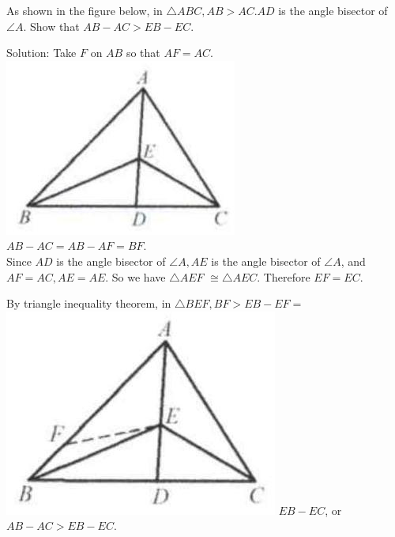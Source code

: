 \documentclass{article}
\begin{document}
As shown in the figure below, in \(\triangle A B C, A B>A C . A D\) is the angle bisector of \(\angle A\). Show that \(A B-A C>E B-E C\).

Solution:
Take \(F\) on \(A B\) so that \(A F=A C\).\\
\centering
\includegraphics[width=\textwidth]{images/057(2).jpg}\\
\(A B-A C=A B-A F=B F\).\\
Since \(A D\) is the angle bisector of \(\angle A, A E\) is the angle bisector of \(\angle A\), and \(A F=A C, A E=A E\). So we have \(\triangle A E F\) \(\cong \triangle A E C\). Therefore \(E F=E C\).

By triangle inequality theorem, in \(\triangle B E F, B F>E B-E F=\)\\
\includegraphics[width=\textwidth]{images/057(1).jpg} \(E B-E C\), or \(A B-A C>E B-E C\).
\end{document}
